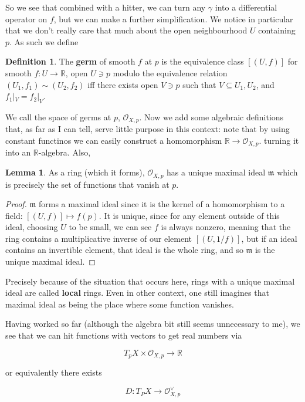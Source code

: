 \documentclass{article}
\theoremstyle{definition}
\newtheorem{definition}{Definition}
\newtheorem{lemma}{Lemma}
\begin{document}
So we see that combined with a hitter, we can turn any $\gamma$ into a
differential operator on $f$, but we can make a further simplification. We
notice in particular that we don't really care that much about the open
neighbourhood $U$ containing $p$. As such we define

\begin{definition}
The \textbf{germ} of smooth $f$ at $p$ is the equivalence class $[(U, f)]$ for
smooth $f: U \to \mathbb{R}$, open $U \ni p$ modulo the equivalence relation
$(U_1, f_1) \sim (U_2, f_2)$ iff there exists open $V \ni p$ such that $V
\subseteq U_1, U_2$, and $f_1 |_V = f_2 |_V$.
\end{definition}

We call the space of germs at $p$, $\mathcal{O}_{X, p}$. Now we add some
algebraic definitions that, as far as I can tell, serve little purpose in this
context: note that by using constant functinos we can easily construct a
homomorphism $\mathbb{R} \to \mathcal{O}_{X, p}$. turning it into an
$\mathbb{R}$-algebra. Also,

\begin{lemma}
As a ring (which it forms), $\mathcal{O}_{X, p}$ has
a unique maximal ideal $\mathfrak{m}$ which is precisely the set of functions
that vanish at $p$. 
\end{lemma}
\begin{proof}
$\mathfrak{m}$ forms a maximal ideal since it is the kernel of a homomorphism to
a field: $[(U, f)] \mapsto f(p)$. It is unique, since for any element outside of
this ideal, choosing $U$ to be small, we can see $f$ is always nonzero, meaning
that the ring contains a multiplicative inverse of our element $[(U, 1/f)]$, but
if an ideal contains an invertible element, that ideal is the whole ring, and so
$\mathfrak{m}$ is the unique maximal ideal.
\end{proof}

Precisely because of the situation that occurs here, rings with a unique maximal
ideal are called \textbf{local} rings. Even in other context, one still imagines
that maximal ideal as being the place where some function vanishes. 

Having worked so far (although the algebra bit still seems unnecessary to me),
we see that we can hit functions with vectors to get real numbers via

$$ T_pX \times \mathcal{O}_{X, p} \to \mathbb{R} $$

or equivalently there exists 

$$ D: T_PX \to \mathcal{O}^\vee_{X, p} $$
\end{document}
